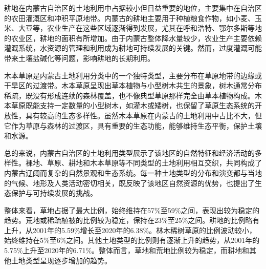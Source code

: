\documentclass{article}
\begin{document}
		耕地在内蒙古自治区的土地利用中占据较小但日益重要的地位，主要集中在自治区的农田灌溉区和冲积平原地带。内蒙古的耕地主要用于种植粮食作物，如小麦、玉米、大豆等，农业生产在这些区域逐渐得到发展，尤其在呼和浩特、鄂尔多斯等地的农业区，耕地的面积有所增加。由于内蒙古整体降水量较少，农业生产主要依赖灌溉系统，水资源的管理和利用成为耕地可持续发展的关键。然而，过度灌溉可能带来土壤盐碱化等问题，影响耕地的长期利用。
		
		木本草原是内蒙古土地利用分类中的一个独特类型，主要分布在草原地带的边缘或干旱区的过渡带。木本草原呈现出草本植物与小型树木共生的景象，树木通常分布稀疏，既没有形成连续的森林覆盖，也不像典型草原那样完全由草本植物构成。木本草原既能支持一定数量的小型树木，如灌木或矮树，也保留了草原生态系统的开放性，具有较高的生态多样性。虽然木本草原在内蒙古的土地利用中占比不大，但它作为草原与森林的过渡区，具有重要的生态功能，能够维持生态平衡，保护土壤和水源。
		
		总的来说，内蒙古自治区的土地利用类型展示了该地区的自然特征和经济活动的多样性。裸地、草原、耕地和木本草原等不同类型的土地利用相互交织，共同构成了内蒙古辽阔而复杂的自然景观和生态系统。每一种土地类型的分布和演变都与当地的气候、地形及人类活动密切相关，既反映了该地区自然资源的优势，也提出了生态保护与可持续发展的挑战。
		
		整体来看，草地占据了最大比例，始终维持在57\%至59\%之间，表现出较为稳定的趋势。荒地或稀疏植被的比例较为稳定，保持在23\%至25\%之间。耕地的比例略有上升，从2001年的5.59\%增长至2020年的6.38\%。林木稀树草原的比例波动较小，始终维持在5\%至6\%之间。其他土地类型的比例则有逐渐上升的趋势，从2001年的5.75\%上升至2020年的6.71\%。整体而言，草地和荒地比例较为稳定，而耕地和其他土地类型呈现逐步增加的趋势。
\end{document}
